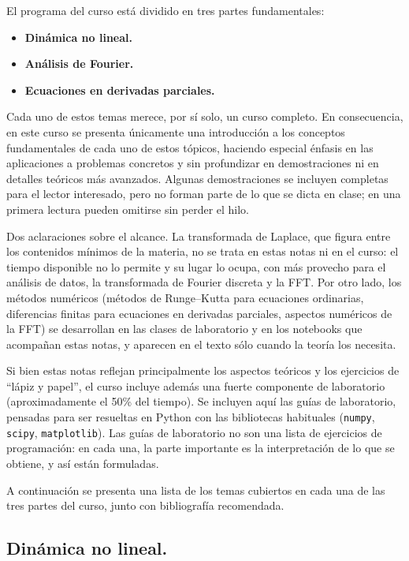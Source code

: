 \documentclass[12pt, a4paper]{amsbook}
\theoremstyle{remark}
\theoremstyle{definition}
\numberwithin{section}{chapter}
\numberwithin{subsection}{section}
\numberwithin{equation}{section}
\numberwithin{figure}{chapter}
\begin{document}
El programa del curso está dividido en tres partes fundamentales:
\begin{itemize}
\item \textbf{Dinámica no lineal.}
\item \textbf{Análisis de Fourier.}
\item \textbf{Ecuaciones en derivadas parciales.}
\end{itemize}

Cada uno de estos temas merece, por sí solo, un curso completo. En consecuencia, en este curso se presenta únicamente una introducción a los conceptos fundamentales de cada uno de estos tópicos, haciendo especial énfasis en las aplicaciones a problemas concretos y sin profundizar en demostraciones ni en detalles teóricos más avanzados. Algunas demostraciones se incluyen completas para el lector interesado, pero no forman parte de lo que se dicta en clase; en una primera lectura pueden omitirse sin perder el hilo.

Dos aclaraciones sobre el alcance. La transformada de Laplace, que figura entre los contenidos mínimos de la materia, no se trata en estas notas ni en el curso: el tiempo disponible no lo permite y su lugar lo ocupa, con más provecho para el análisis de datos, la transformada de Fourier discreta y la FFT. Por otro lado, los métodos numéricos (métodos de Runge--Kutta para ecuaciones ordinarias, diferencias finitas para ecuaciones en derivadas parciales, aspectos numéricos de la FFT) se desarrollan en las clases de laboratorio y en los notebooks que acompañan estas notas, y aparecen en el texto sólo cuando la teoría los necesita.

Si bien estas notas reflejan principalmente los aspectos teóricos y los ejercicios de ``lápiz y papel'', el curso incluye además una fuerte componente de laboratorio (aproximadamente el 50\% del tiempo). Se incluyen aquí las guías de laboratorio, pensadas para ser resueltas en Python con las bibliotecas habituales (\texttt{numpy}, \texttt{scipy}, \texttt{matplotlib}). Las guías de laboratorio no son una lista de ejercicios de programación: en cada una, la parte importante es la interpretación de lo que se obtiene, y así están formuladas.

A continuación se presenta una lista de los temas cubiertos en cada una de las tres partes del curso, junto con bibliografía recomendada.

\subsection*{Dinámica no lineal.}
\end{document}
